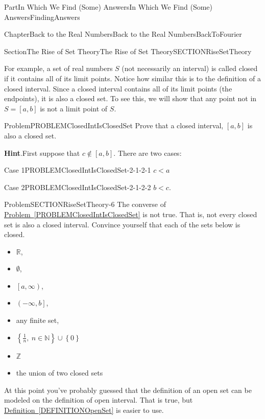 \documentclass[oneside,10pt,]{book}
\newcommand{\blocktitlefont}{\relax}
\newcommand{\xreffont}{\relax}
\numberwithin{equation}{part}
\newcommand{\RR}{\mathbb {R}}
\newcommand{\ZZ}{\mathbb {Z}}
\newcommand{\lt}{<}
\begin{document}
\begin{partptx}{Part}{In Which We Find (Some) Answers}{}{In Which We Find (Some) Answers}{}{}{FindingAnswers}
\begin{chapterptx}{Chapter}{Back to the Real Numbers}{}{Back to the Real Numbers}{}{}{BackToFourier}
\begin{sectionptx}{Section}{The Rise of Set Theory}{}{The Rise of Set Theory}{}{}{SECTIONRiseSetTheory}
\par
For example, a set of real numbers \(S\) (not necessarily an interval) is called closed if it contains all of its limit points. Notice how similar this is to the definition of a closed interval. Since a closed interval contains all of its limit points (the endpoints), it is also a closed set.  To see this, we will show that any point not in \(S=[a,b]\) is not a limit point of \(S\).     %
\begin{problem}{Problem}{}{PROBLEMClosedIntIsClosedSet}%
Prove that a closed interval, \([a,b]\) is also a closed set.   %
\par\smallskip%
\noindent\textbf{\blocktitlefont Hint}.\hypertarget{PROBLEMClosedIntIsClosedSet-2}{}\quad{}First suppose that \(c\notin [a,b]\). There are two cases:%
\begin{descriptionlist}
\begin{dlimedium}{Case 1}{PROBLEMClosedIntIsClosedSet-2-1-2-1}%
\(\displaystyle c\lt a\)%
\end{dlimedium}%
\begin{dlimedium}{Case 2}{PROBLEMClosedIntIsClosedSet-2-1-2-2}%
\(b\lt c\).%
\end{dlimedium}%
\end{descriptionlist}
%
\end{problem}
\begin{problem}{Problem}{}{SECTIONRiseSetTheory-6}%
The converse of \hyperref[PROBLEMClosedIntIsClosedSet]{Problem~{\xreffont\ref{PROBLEMClosedIntIsClosedSet}}} is not true. That is, not every closed set is also a closed interval. Convince yourself that each of the sets below is closed.%
\begin{multicols}{2}
\begin{itemize}[label=\textbullet]
\item{}\(\RR\),%
\item{}\(\emptyset\),%
\item{}\(\left[a,\infty \right)\),%
\item{}\(\left(-\infty ,b\right]\),%
\item{}any finite set,%
\item{}\(\displaystyle \left\{\frac{1}{n},\ n\in \mathbb{N}\right\}\cup
\left\{0\right\}\)%
\item{}\(\displaystyle \ZZ\)%
\item{}the union of two closed sets%
\end{itemize}
\end{multicols}
%
\end{problem}
At this point you've probably guessed that the definition of an open set can be  modeled on the definition of open interval. That is true, but \hyperref[DEFINITIONOpenSet]{Definition~{\xreffont\ref{DEFINITIONOpenSet}}} is easier to use.%

\end{sectionptx}
\end{chapterptx}
\end{partptx}
\end{document}
